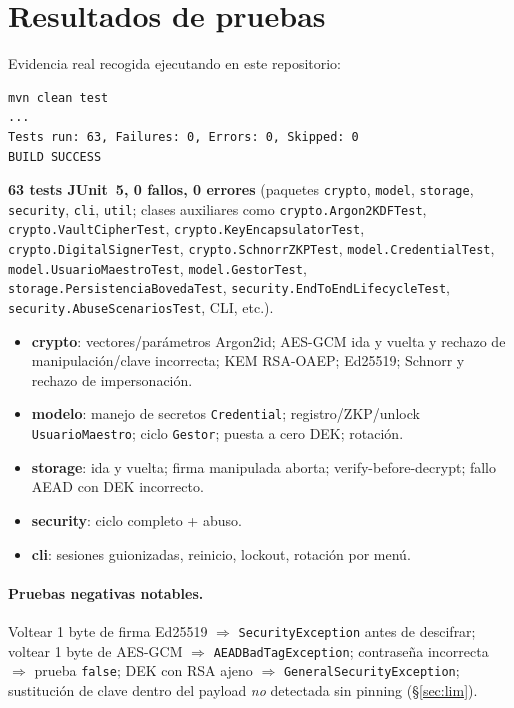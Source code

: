 \documentclass[11pt,a4paper]{article}
\begin{document}
\section{Resultados de pruebas}\label{sec:tests}
Evidencia real recogida ejecutando en este repositorio:
\begin{lstlisting}
mvn clean test
...
Tests run: 63, Failures: 0, Errors: 0, Skipped: 0
BUILD SUCCESS
\end{lstlisting}
\textbf{63 tests JUnit~5, 0 fallos, 0 errores} (paquetes \texttt{crypto},
\texttt{model}, \texttt{storage}, \texttt{security}, \texttt{cli}, \texttt{util};
clases auxiliares como \texttt{crypto.Argon2KDFTest}, \texttt{crypto.VaultCipherTest},
\texttt{crypto.KeyEncapsulatorTest}, \texttt{crypto.DigitalSignerTest},
\texttt{crypto.SchnorrZKPTest}, \texttt{model.CredentialTest},
\texttt{model.UsuarioMaestroTest}, \texttt{model.GestorTest},
\texttt{storage.PersistenciaBovedaTest}, \texttt{security.EndToEndLifecycleTest},
\texttt{security.AbuseScenariosTest}, CLI, etc.).
\begin{itemize}
  \item \textbf{crypto}: vectores/parámetros Argon2id; AES-GCM ida y vuelta y
        rechazo de manipulación/clave incorrecta; KEM RSA-OAEP; Ed25519;
        Schnorr y rechazo de impersonación.
  \item \textbf{modelo}: manejo de secretos \texttt{Credential};
        registro/ZKP/unlock \texttt{UsuarioMaestro}; ciclo \texttt{Gestor};
        puesta a cero DEK; rotación.
  \item \textbf{storage}: ida y vuelta; firma manipulada aborta;
        verify-before-decrypt; fallo AEAD con DEK incorrecto.
  \item \textbf{security}: ciclo completo + abuso.
  \item \textbf{cli}: sesiones guionizadas, reinicio, lockout, rotación por menú.
\end{itemize}
\paragraph{Pruebas negativas notables.}
Voltear 1 byte de firma Ed25519 $\Rightarrow$ \texttt{SecurityException} antes de
descifrar; voltear 1 byte de AES-GCM $\Rightarrow$ \texttt{AEADBadTagException};
contraseña incorrecta $\Rightarrow$ prueba \texttt{false}; DEK con RSA ajeno
$\Rightarrow$ \texttt{GeneralSecurityException}; sustitución de clave dentro del
payload \emph{no} detectada sin pinning (§\ref{sec:lim}).
\end{document}
